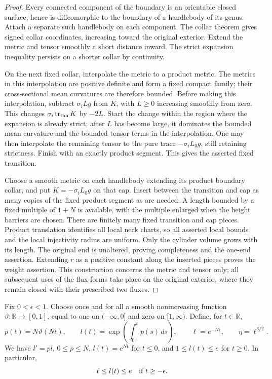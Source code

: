 \begin{proof}
Every connected component of the boundary is an orientable closed
surface, hence is diffeomorphic to the boundary of a handlebody of
its genus.  Attach a separate such handlebody on each component.
The collar theorem gives signed collar coordinates, increasing toward
the original exterior.  Extend the metric and tensor smoothly a short
distance inward.  The strict expansion inequality persists on a
shorter collar by continuity.

On the next fixed collar, interpolate the metric to a product metric.
The metrics in this interpolation are positive definite and form a
fixed compact family; their cross-sectional mean curvatures are
therefore bounded.  Before making this interpolation, subtract
$\sigma_i Lg$ from $K$, with $L\ge0$ increasing smoothly from zero.
This changes $\sigma_i\operatorname{tr}_{\rm tan}K$ by $-2L$.
Start the change within the region where the expansion is already
strict; after $L$ has become large, it dominates the bounded mean
curvature and the bounded tensor terms in the interpolation.
One may then interpolate the remaining tensor to the pure trace
$-\sigma_iL_0g$, still retaining strictness.  Finish with an exactly
product segment.  This gives the asserted fixed transition.

Choose a smooth metric on each handlebody extending its product
boundary collar, and put $K=-\sigma_iL_0g$ on that cap.  Insert between
the transition and cap as many copies of the fixed product segment as
are needed.  A length bounded by a fixed multiple of $1+N$ is
available, with the multiple enlarged when the height barriers are
chosen.  There are finitely many fixed transition and cap pieces.
Product translation identifies all local neck charts, so all asserted
local bounds and the local injectivity radius are uniform.  Only
the cylinder volume grows with its length.  The original end is
unaltered, proving completeness and the one-end assertion.
Extending $r$ as a positive constant along the inserted pieces proves
the weight assertion.  This construction concerns the metric and
tensor only; all subsequent uses of the flux forms take place on
the original exterior, where they remain closed with their prescribed
two fluxes.
\end{proof}

Fix $0<\epsilon<1$.  Choose once and for all a smooth nonincreasing
function $\vartheta:\mathbb R\to[0,1]$, equal to one on $(-\infty,0]$
and zero on $[1,\infty)$.  Define, for $t\in\mathbb R$,
\begin{equation}\label{sy:compression-functions}
 p(t)=N\vartheta(Nt),\qquad
 l(t)=\exp\left(\int_0^t p(s)\,ds\right),\qquad
 \ell=e^{-N\epsilon},\qquad \eta=\ell^{3/2}.
\end{equation}
We have $l'=pl$, $0\le p\le N$, $l(t)=e^{Nt}$ for $t\le0$,
and $1\le l(t)\le e$ for $t\ge0$.  In particular,
\begin{equation}\label{sy:l-bounds}
 \ell\le l(t)\le e\quad\hbox{if }t\ge-\epsilon.
\end{equation}

